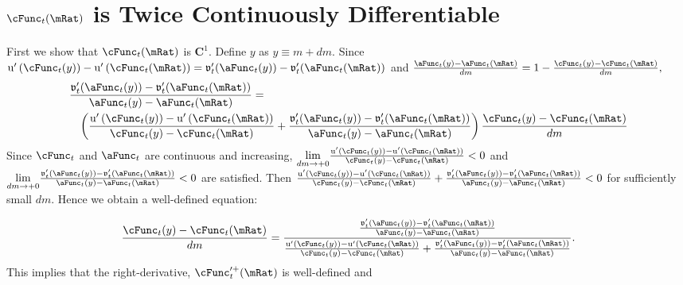\documentclass[titlepage]{\econtex}\providecommand{\texname}{BufferStockTheory}
\begin{document}
\hypertarget{cFunc-is-Twice-Continuously-Differentiable}{}
\section{$\cFunc_{t}(\mRat)$ is Twice Continuously Differentiable}\label{sec:CIsTwiceDifferentiable}

First we show that $\cFunc_{t}(\mRat)$ is $\mathbf{C}^{1}.$ Define $y$ as
$y\equiv m+dm$.
  Since $\util^{\prime }\left( \cFunc_{t}(y)\right) -\util^{\prime }\left(
    \cFunc_{t}(\mRat)\right) =\mathfrak{v}_{t}^{\prime
  }({\aFunc}_{t}(y))-\mathfrak{v}_{t}^{\prime }({\aFunc}_{t}(\mRat))$ and $
  \frac{{\aFunc}_{t}(y)-{\aFunc}_{t}(\mRat)}{dm}=1-\frac{\cFunc_{t}(y)-\cFunc_{t}(\mRat)}{dm},$
\begin{eqnarray*}
\lefteqn{\frac{\mathfrak{v}_{t}^{\prime }({\aFunc}_{t}(y))-\mathfrak{v}_{t}^{\prime }({\aFunc}_{t}(\mRat))}{{\aFunc}_{t}(y)-{\aFunc}_{t}(\mRat)} =}   & & \\
 & & \left( \frac{\util^{\prime }\left( \cFunc_{t}(y)\right) -\util^{\prime }\left( \cFunc_{t}(\mRat)\right) }{\cFunc_{t}(y)-\cFunc_{t}(\mRat)}+\frac{\mathfrak{v}_{t}^{\prime }({\aFunc}_{t}(y))-\mathfrak{v}_{t}^{\prime }({\aFunc}_{t}(\mRat))}{{\aFunc}_{t}(y)-{\aFunc}_{t}(\mRat)}\right) \frac{\cFunc_{t}(y)-\cFunc_{t}(\mRat)}{dm}
\end{eqnarray*}
Since $\cFunc_{t}$ and $\aFunc_{t}$ are continuous and increasing, $\underset{
dm\rightarrow +0}{\lim }\frac{\util^{\prime }\left( \cFunc_{t}(y)\right) -\util^{\prime
}\left( \cFunc_{t}(\mRat)\right) }{\cFunc_{t}(y)-\cFunc_{t}(\mRat)}<0$ and
$\underset{dm\rightarrow+0}{\lim }\frac{\mathfrak{v}_{t}^{\prime }({\aFunc}_{t}(y))-\mathfrak{v}_{t}^{\prime }({\aFunc}_{t}(\mRat))}{
{\aFunc}_{t}(y)-{\aFunc}_{t}(\mRat)}< 0$
are satisfied. Then $\frac{\util^{\prime }\left(
\cFunc_{t}(y)\right) -\util^{\prime }\left( \cFunc_{t}(\mRat)\right) }{\cFunc_{t}(y)-\cFunc_{t}(\mRat)}+
\frac{\mathfrak{v}_{t}^{\prime }({\aFunc}_{t}(y))-\mathfrak{v}_{t}^{\prime }({\aFunc}_{t}(\mRat))}{{\aFunc}_{t}(y)-{\aFunc}_{t}(\mRat)}
<0$ for sufficiently small $dm$.
 Hence we obtain a well-defined equation:

\begin{equation*}
\frac{\cFunc_{t}(y)-\cFunc_{t}(\mRat)}{dm}=\frac{\frac{\mathfrak{v}_{t}^{\prime
}({\aFunc}_{t}(y))-\mathfrak{v}_{t}^{\prime }({\aFunc}_{t}(\mRat))}{{\aFunc}_{t}(y)-{\aFunc}_{t}(\mRat)}}{\frac{\util^{\prime
}\left( \cFunc_{t}(y)\right) -\util^{\prime }\left( \cFunc_{t}(\mRat)\right) }{
\cFunc_{t}(y)-\cFunc_{t}(\mRat)}+\frac{\mathfrak{v}_{t}^{\prime }({\aFunc}_{t}(y))-\mathfrak{v}_{t}^{\prime }({\aFunc}_{t}(\mRat))
}{{\aFunc}_{t}(y)-{\aFunc}_{t}(\mRat)}}.
\end{equation*}
This implies that the right-derivative, $\cFunc_{t}^{\prime +}(\mRat)$ is
well-defined and
\end{document}
